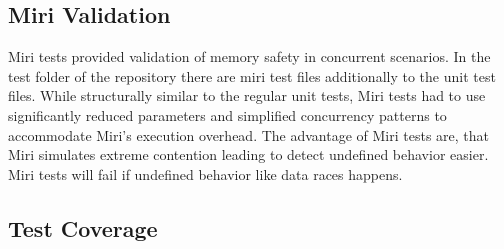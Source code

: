 \subsection{Miri Validation}
Miri tests provided validation of memory safety in concurrent scenarios. In the test folder of the repository there are miri test files additionally to the unit test files. While structurally similar to the regular unit tests, Miri tests had to use significantly reduced parameters and simplified concurrency patterns to accommodate Miri's execution overhead. The advantage of Miri tests are, that Miri simulates extreme contention leading to detect undefined behavior easier. Miri tests will fail if undefined behavior like data races happens.

\subsection{Test Coverage}
